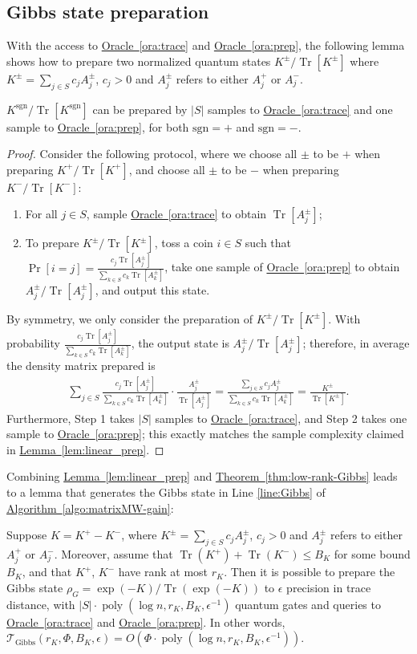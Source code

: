 \documentclass[a4paper,UKenglish,cleveref, autoref]{lipics-v2019}
\theoremstyle{remark}
\numberwithin{equation}{section}
\numberwithin{oracle}{section}
\numberwithin{remark}{section}
\newcommand{\ora}[1]{\hyperref[ora:#1]{Oracle~\ref*{ora:#1}}}
\newcommand{\thm}[1]{\hyperref[thm:#1]{Theorem~\ref*{thm:#1}}}
\newcommand{\lem}[1]{\hyperref[lem:#1]{Lemma~\ref*{lem:#1}}}
\newcommand{\algo}[1]{\hyperref[algo:#1]{Algorithm~\ref*{algo:#1}}}
\DeclareMathOperator{\poly}{poly}
\DeclareMathOperator{\tr}{Tr}
\DeclareMathOperator{\Tr}{Tr}
\begin{document}
\subsection{Gibbs state preparation}
\noindent With the access to \ora{trace} and \ora{prep}, the following lemma shows how to prepare two normalized quantum states $K^{\pm}/\Tr[K^{\pm}]$ where $K^{\pm}=\sum_{j \in S} c_j A_j^{\pm}$, $c_j>0$ and $A_j^{\pm}$ refers to either $A_j^{+}$ or $A_j^{-}$.
\begin{lemma} \label{lem:linear_prep}
$K^{\text{sgn}}/\Tr[K^{\text{sgn}}]$ can be prepared by $|S|$ samples to \ora{trace} and one sample to \ora{prep}, for both $\text{sgn}=+$ and $\text{sgn}=-$.
\end{lemma}
\begin{proof}
Consider the following protocol, where we choose all $\pm$ to be $+$ when preparing $K^{+}/\Tr[K^{+}]$, and choose all $\pm$ to be $-$ when preparing $K^{-}/\Tr[K^{-}]$:
\begin{enumerate}
\item For all $j\in S$, sample \ora{trace} to obtain $\Tr[A_j^{\pm}]$;
\item To prepare $K^{\pm}/\Tr[K^{\pm}]$, toss a coin $i\in S$ such that $\Pr[i=j]=\frac{c_{j}\Tr[A_j^{\pm}]}{\sum_{k\in S}c_{k}\Tr[A_k^{\pm}]}$, take one sample of \ora{prep} to obtain $A_{j}^{\pm}/\Tr[A_{j}^{\pm}]$, and output this state.
\end{enumerate}
By symmetry, we only consider the preparation of $K^{\pm}/\Tr[K^{\pm}]$. With probability $\frac{c_{j}\Tr[A_j^{\pm}]}{\sum_{k\in S}c_{k}\Tr[A_k^{\pm}]}$, the output state is $A_{j}^{\pm}/\Tr[A_{j}^{\pm}]$; therefore, in average the density matrix prepared is
\begin{align}
\sum_{j\in S}\frac{c_{j}\Tr[A_j^{\pm}]}{\sum_{k\in S}c_{k}\Tr[A_k^{\pm}]}\cdot \frac{A_{j}^{\pm}}{\Tr[A_{j}^{\pm}]}=\frac{\sum_{j\in S}c_{j}A_j^{\pm}}{\sum_{k\in S}c_{k}\Tr[A_k^{\pm}]}=\frac{K^{\pm}}{\Tr[K^{\pm}]}.
\end{align}
Furthermore,  Step 1 takes $|S|$ samples to \ora{trace}, and Step 2 takes one sample to \ora{prep}; this exactly matches the sample complexity claimed in \lem{linear_prep}.
\end{proof}

Combining \lem{linear_prep} and \thm{low-rank-Gibbs} leads to a lemma that generates the Gibbs state in Line \ref{line:Gibbs} of \algo{matrixMW-gain}:
\begin{lemma} \label{lem:gibbs_prep}
Suppose $K = K^+ - K^-$, where $K^{\pm}=\sum_{j \in S} c_j A_j^{\pm}$, $c_j>0$ and $A_j^{\pm}$ refers to either $A_j^{+}$ or $A_j^{-}$. Moreover, assume that $\tr(K^+) + \tr(K^-) \leq B_{K}$ for some bound $B_{K}$, and that $K^+$, $K^-$ have rank at most $r_{K}$. Then it is possible to prepare the Gibbs state $\rho_G=\exp(-K)/\tr(\exp(-K))$ to $\epsilon$ precision in trace distance, with $|S|\cdot\poly(\log n, r_{K}, B_{K}, \epsilon^{-1})$ quantum gates and queries to \ora{trace} and \ora{prep}. In other words, $\mathcal{T}_{\text{Gibbs}}(r_{K},\Phi,B_{K},\epsilon)=O(\Phi\cdot\poly(\log n, r_{K}, B_{K}, \epsilon^{-1}))$.
\end{lemma}
\end{document}
